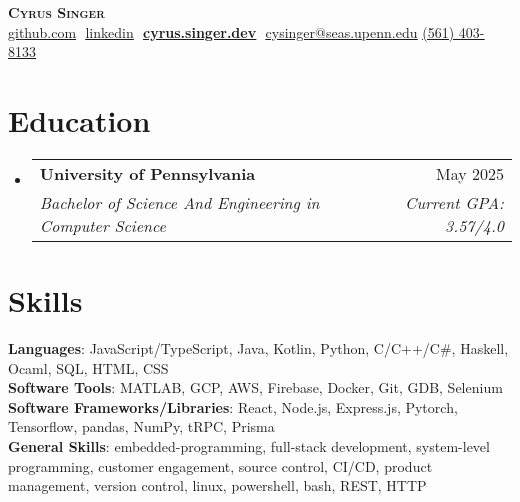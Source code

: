 \documentclass[letterpaper,11pt]{article}
\makeatletter
\newcommand{\resumeSubheading}[4]{
  \vspace{-2pt}\item
    \begin{tabular*}{0.97\textwidth}[t]{l@{\extracolsep{\fill}}r}
      \textbf{#1} & #2 \\
      \textit{\small#3} & \textit{\small #4} \\
    \end{tabular*}\vspace{-7pt}
}
\newcommand{\resumeSubHeadingListStart}{\begin{itemize}[leftmargin=0.15in, label={}]}
\newcommand{\resumeSubHeadingListEnd}{\end{itemize}}
\makeatother
\begin{document}
\hfill

\begin{center}
    \textbf{\Huge \scshape Cyrus Singer} \\ \vspace{8pt}
    \small 
    \href{https://github.com/brianbob12}{\underline{github.com}} $  $
    \href{https://www.linkedin.com/in/cyrus-singer}{\underline{linkedin}} $  $
    \href{https://cyrus.singer.dev}{\textbf{\underline{cyrus.singer.dev}}} $ $
    \href{mailto:cysinger@seas.upenn.edu}
    {\underline{cysinger@seas.upenn.edu}}
    \href{tel:561-403-8133}{\underline{(561) 403-8133}}
\end{center}

\section{ Education}
  \resumeSubHeadingListStart
  
    \resumeSubheading
      {University of Pennsylvania}{May 2025}
      {Bachelor of Science And Engineering in Computer Science}{Current GPA: 3.57/4.0}
      \vspace{3pt}

      
      
  \resumeSubHeadingListEnd

  \section{ Skills}
  \begin{itemize}[leftmargin=0.15in, label={}]
      \small{\item{
      
      \textbf{Languages}{: JavaScript/TypeScript, Java, Kotlin, Python, C/C++/C\#, Haskell, Ocaml, SQL, HTML, CSS} \\
      
      \textbf{Software Tools}{: MATLAB, GCP, AWS, Firebase, Docker, Git, GDB, Selenium}\\

      \textbf{Software Frameworks/Libraries}{: React, Node.js, Express.js, Pytorch, Tensorflow, pandas, NumPy, tRPC, Prisma} \\

      \textbf{General Skills}{: embedded-programming, full-stack development, system-level programming, customer engagement, source control, CI/CD, product management, version control, linux, powershell, bash, REST, HTTP}
      }}
  \end{itemize}
\end{document}
